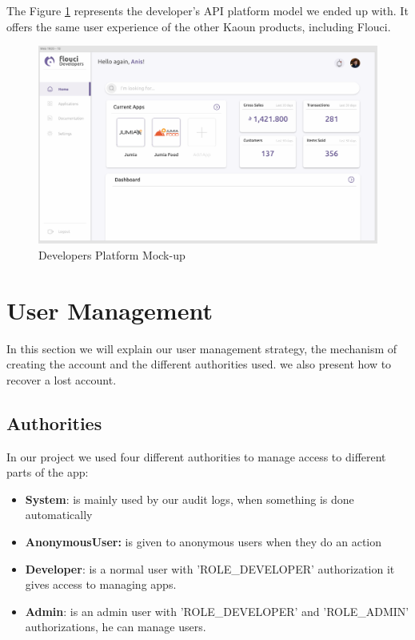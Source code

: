 \begin{spacing}{1.2}
The Figure \ref{developersPlatform} represents the developer's API platform model we ended up with. It offers the same user experience of the other Kaoun products, including Flouci.

\begin{figure}[H]\centering
\includegraphics[scale=0.4]{web_screen}
\caption{Developers Platform Mock-up}
\label{developersPlatform}
\end{figure}

\section{User Management}
In this section we will explain our user management strategy, the mechanism of creating the account and the different authorities used. we also present how to recover a lost account.
\subsection{Authorities}
In our project we used four different authorities to manage access to different parts of the app:
\begin{itemize}
	\item \textbf{System}:  is mainly used by our audit logs, when something is done automatically
	\item \textbf{AnonymousUser:}  is given to anonymous users when they do an action
	\item \textbf{Developer}:  is a normal user with 'ROLE\_DEVELOPER' authorization it gives access to managing apps.
	\item  \textbf{Admin}:  is an admin user with 'ROLE\_DEVELOPER' and 'ROLE\_ADMIN' authorizations, he can manage users.
\end{itemize}


\end{spacing}
